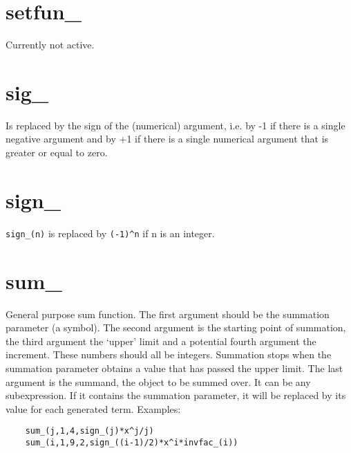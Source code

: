 
\section{setfun\_}
\label{funsetfun}
\noindent Currently not active.


\section{sig\_}
\label{funsig}
\noindent Is replaced by the sign of the (numerical) argument, i.e. by -1 
if there is a single negative argument and by +1 if there is a single 
numerical argument that is greater or equal to zero.


\section{sign\_}
\label{funsign}
\noindent \verb:sign_(n): is replaced by \verb:(-1)^n: if n is an 
integer.


\section{sum\_}
\label{funsum}
\noindent General purpose sum function. The first argument should 
be the summation parameter (a symbol). The second argument is the starting 
point of summation, the third argument the `upper' limit and a potential 
fourth argument the increment. These numbers should all be integers. 
Summation stops when the summation parameter obtains a value that has 
passed the upper limit. The last argument is the summand, the object to be 
summed over. It can be any subexpression. If it contains the summation 
parameter, it will be replaced by its value for each generated term. 
Examples:
\begin{verbatim}
    sum_(j,1,4,sign_(j)*x^j/j)
    sum_(i,1,9,2,sign_((i-1)/2)*x^i*invfac_(i))
\end{verbatim}


